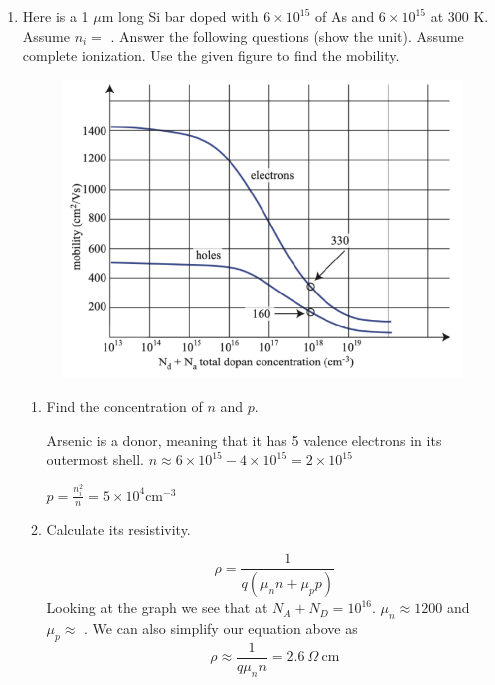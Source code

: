 \begin{enumerate}
        \item Here is a 1 $\mu$m long Si bar doped with $6 \times 10^{15}$ \conc of As and $6 \times 10^{15}$ \conc at 300 K. Assume $n_i =$ \conc. Answer the following questions (show the unit). Assume complete ionization. Use the given figure to find the mobility.
        \begin{figure}[H]
            \centering
            \includegraphics[scale=0.8]{figs/ch01/ans3.png}
        \end{figure}
        \begin{enumerate}
            \item Find the concentration of $n$ and $p$.
            \begin{Ans}
                Arsenic is a donor, meaning that it has 5 valence electrons in its outermost shell.
                $n \approx 6 \times 10^{15} - 4 \times 10^{15} = 2  \times 10^{15}$

                $p = \frac{n_i^2}{n} = 5 \times 10^4 \text{cm}^{-3}$
            \end{Ans}
            
            \item Calculate its resistivity.
            \begin{Ans}
                    \[\rho = \frac{1}{q(\mu_n n + \mu_p p)}\]
                Looking at the graph we see that at $N_A + N_D = 10^{16}$. $\mu_n \approx 1200$ \mobility and $\mu_p \approx$ \mobility. We can also simplify our equation above as 
                    \[\rho \approx \frac{1}{q \mu_n n} = 2.6 ~ \Omega ~\text{cm}\]
            \end{Ans}


\end{enumerate}
\end{enumerate}
